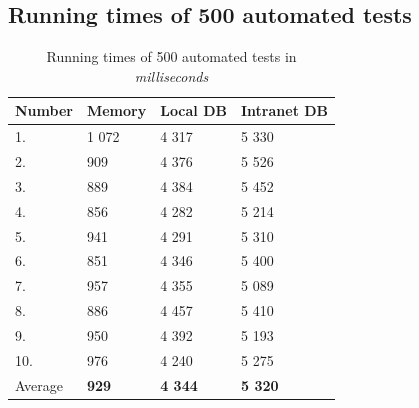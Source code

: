 \documentclass[
  print,
  table,
  nolof,
  nolot,
  nocover,
  oneside
]{fithesis3}
\begin{document}
\subsection{Running times of 500 automated tests}
\begin{table}[H]
  \begin{tabularx}{\textwidth}{XXXX}
    \toprule
    Number & Memory & Local DB & Intranet DB\\
    \midrule
    1.  & 1 072 & 4 317 & 5 330 \\
    2.  &   909 & 4 376 & 5 526 \\
    3.  &   889 & 4 384 & 5 452 \\
    4.  &   856 & 4 282 & 5 214 \\
    5.  &   941 & 4 291 & 5 310 \\
    6.  &   851 & 4 346 & 5 400 \\
    7.  &   957 & 4 355 & 5 089 \\
    8.  &   886 & 4 457 & 5 410 \\
    9.  &   950 & 4 392 & 5 193 \\
    10. &   976 & 4 240 & 5 275 \\
    \bottomrule
    Average & \textbf{929} & \textbf{4 344} & \textbf{5 320}\\
  \end{tabularx}
  \caption{Running times of 500 automated tests in \textit{milliseconds}}
  \label{tab:500tests}
\end{table}

\end{document}

